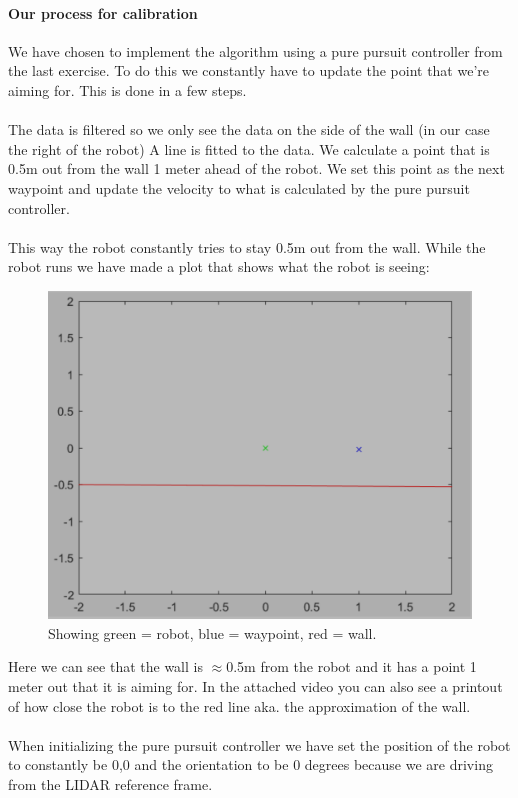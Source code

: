 \documentclass[12pt,a4paper]{article}
\begin{document}
	\paragraph{Our process for calibration}
	We have chosen to implement the algorithm using a pure pursuit controller from the last exercise. To do this we constantly have to update the point that we’re aiming for. This is done in a few steps.
	\\\\
	The data is filtered so we only see the data on the side of the wall (in our case the right of the robot)
	A line is fitted to the data.
	We calculate a point that is 0.5m out from the wall 1 meter ahead of the robot.
	We set this point as the next waypoint and update the velocity to what is calculated by the pure pursuit controller.
	\\\\
	This way the robot constantly tries to stay 0.5m out from the wall. While the robot runs we have made a plot that shows what the robot is seeing:
	\begin{figure}[!h]
		\centering
		\includegraphics[width=\textwidth]{fig7}
		\caption{Showing green = robot, blue = waypoint, red = wall.}
		\label{fig:fig7}
	\end{figure}
	
	Here we can see that the wall is $\approx$0.5m from the robot and it has a point 1 meter out that it is aiming for. In the attached video you can also see a printout of how close the robot is to the red line aka. the approximation of the wall.
	\\\\
	When initializing the pure pursuit controller we have set the position of the robot to constantly be 0,0 and the orientation to be 0 degrees because we are driving from the LIDAR reference frame. 
\end{document}
